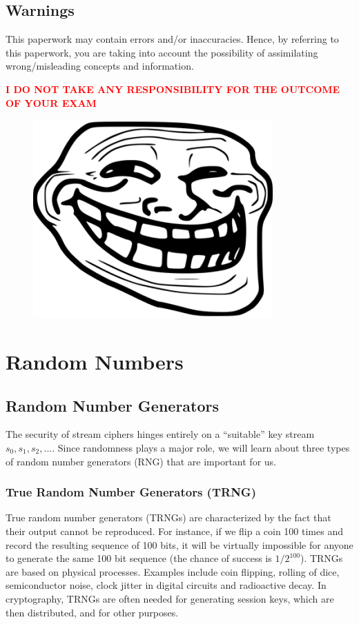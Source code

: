 \documentclass[11pt, a4paper]{article}
\newcommand{\doublequotes}[1]{“#1”}
\begin{document}
\subsection*{Warnings}
This paperwork may contain errors and/or inaccuracies. Hence, by referring to this paperwork, you are taking into account the possibility of assimilating wrong/misleading concepts and information.
\begin{center}
    \textcolor{red}{\textbf{I DO NOT TAKE ANY RESPONSIBILITY FOR THE OUTCOME OF YOUR EXAM}}
\end{center}
\begin{figure}[H]
    \centering
    \includegraphics[scale=0.5]{utili/Trollface.png}
\end{figure}

\newpage
\tableofcontents

\newpage
\section{Random Numbers}
\subsection{Random Number Generators}
The security of stream ciphers hinges entirely on a \doublequotes{suitable} key stream $s_0,s_1,s_2,...$. Since randomness plays a major role, we will learn about three types of random number generators (RNG) that are important for us.

\subsubsection{True Random Number Generators (TRNG)}
True random number generators (TRNGs) are characterized by the fact that their output cannot be reproduced. For instance, if we flip a coin 100 times and record the resulting sequence of 100 bits, it will be virtually impossible for anyone to generate the same 100 bit sequence (the chance of success is $1/2^{100}$). TRNGs are based on physical processes. Examples include coin flipping, rolling of dice, semiconductor noise, clock jitter in digital circuits and radioactive decay. In cryptography, TRNGs are often needed for generating session keys, which are then distributed, and for other purposes.
\end{document}
